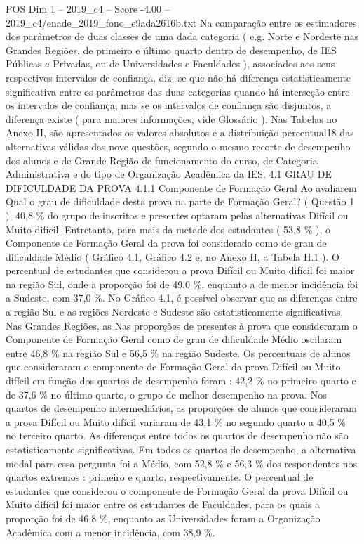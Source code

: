 \begin{textsample}{POS Dim 1 – 2019\_c4 – Score -4.00 – 2019\_c4/enade\_2019\_fono\_e9ada2616b.txt}
Na comparação entre os estimadores dos parâmetros de duas classes de uma dada categoria ( e.g.
Norte e Nordeste nas Grandes Regiões, de primeiro e último quarto dentro de desempenho, de IES Públicas e Privadas, ou de Universidades e Faculdades ), associados aos seus respectivos intervalos de confiança, diz -se que não há diferença estatisticamente significativa entre os parâmetros das duas categorias quando há interseção entre os intervalos de confiança, mas se os intervalos de confiança são disjuntos, a diferença existe ( para maiores informações, vide Glossário ).
Nas Tabelas no Anexo II, são apresentados os valores absolutos e a distribuição percentual18 das alternativas válidas das nove questões, segundo o mesmo recorte de desempenho dos alunos e de Grande Região de funcionamento do curso, de Categoria Administrativa e do tipo de Organização Acadêmica da IES. 4.1 GRAU DE DIFICULDADE DA PROVA 4.1.1 Componente de Formação Geral Ao avaliarem Qual o grau de dificuldade desta prova na parte de Formação Geral? ( Questão 1 ), 40,8 \% do grupo de inscritos e presentes optaram pelas alternativas Difícil ou Muito difícil.
Entretanto, para mais da metade dos estudantes ( 53,8 \% ), o Componente de Formação Geral da prova foi considerado como de grau de dificuldade Médio ( Gráfico 4.1, Gráfico 4.2 e, no Anexo II, a Tabela II.1 ).
O percentual de estudantes que considerou a prova Difícil ou Muito difícil foi maior na região Sul, onde a proporção foi de 49,0 \%, enquanto a de menor incidência foi a Sudeste, com 37,0 \%.
No Gráfico 4.1, é possível observar que as diferenças entre a região Sul e as regiões Nordeste e Sudeste são estatisticamente significativas.
Nas Grandes Regiões, as Nas proporções de presentes à prova que consideraram o Componente de Formação Geral como de grau de dificuldade Médio oscilaram entre 46,8 \% na região Sul e 56,5 \% na região Sudeste.
Os percentuais de alunos que consideraram o componente de Formação Geral da prova Difícil ou Muito difícil em função dos quartos de desempenho foram : 42,2 \% no primeiro quarto e de 37,6 \% no último quarto, o grupo de melhor desempenho na prova.
Nos quartos de desempenho intermediários, as proporções de alunos que consideraram a prova Difícil ou Muito difícil variaram de 43,1 \% no segundo quarto a 40,5 \% no terceiro quarto.
As diferenças entre todos os quartos de desempenho não são estatisticamente significativas.
Em todos os quartos de desempenho, a alternativa modal para essa pergunta foi a Médio, com 52,8 \% e 56,3 \% dos respondentes nos quartos extremos : primeiro e quarto, respectivamente.
O percentual de estudantes que considerou o componente de Formação Geral da prova Difícil ou Muito difícil foi maior entre os estudantes de Faculdades, para os quais a proporção foi de 46,8 \%, enquanto as Universidades foram a Organização Acadêmica com a menor incidência, com 38,9 \%.

\end{textsample}
